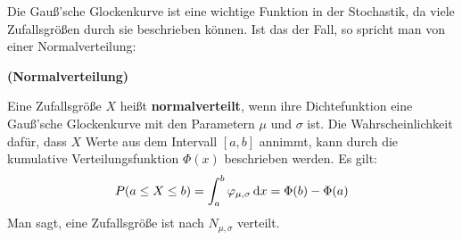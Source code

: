 \documentclass[ngerman, 12pt]{nssheetxea}
\begin{document}
Die Gauß'sche Glockenkurve ist eine wichtige Funktion in der Stochastik, da viele Zufallsgrößen durch sie beschrieben können. Ist das der Fall, so spricht man von einer Normalverteilung:

\begin{definition} \textbf{(Normalverteilung)} \par
Eine Zufallsgröße $X$ heißt \textbf{normalverteilt}, wenn ihre Dichtefunktion eine Gauß'sche Glockenkurve mit den Parametern $\mu$ und $\sigma$ ist. Die Wahrscheinlichkeit dafür, dass $X$ Werte aus dem Intervall $[a,b]$ annimmt, kann durch die kumulative Verteilungsfunktion $\Phi (x)$ beschrieben werden. Es gilt:
\[ P(a\leq X \leq b)=\int_a^b \varphi_{\mu , \sigma} \mathop{}\!\mathrm{d} x = \Phi(b) - \Phi(a)  \]
Man sagt, eine Zufallsgröße ist nach $N_{\mu, \sigma}$ verteilt.
\end{definition}
\end{document}
